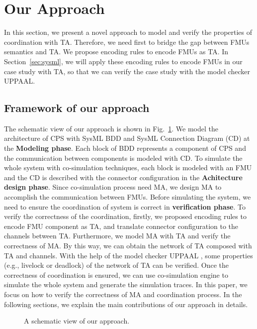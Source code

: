 \section{Our Approach}
In this section, we present a novel approach to model and verify the properties of coordination with TA. Therefore, we need first to bridge the gap between FMUs semantics and TA. We propose encoding rules to encode FMUs as TA. In Section~\ref{sec:sysml}, we will apply these encoding rules to encode FMUs in our case study with TA, so that we can verify the case study with the model checker UPPAAL.
\label{sec:encoding}
\subsection{Framework of our approach}
The schematic view of our approach is shown in Fig.~\ref{paper-arc}. We model the architecture of CPS with SysML BDD and SysML Connection Diagram (CD) at the \textbf{Modeling phase}. Each block of BDD represents a component of CPS and the communication between components is modeled with CD. To simulate the whole system with co-simulation techniques, each block is modeled with an FMU and the CD is described with the connector configuration in the \textbf{Achitecture design phase}. Since co-simulation process need MA, we design MA to accomplish the communication between FMUs. Before simulating the system, we need to ensure the coordination of system is correct in \textbf{verification phase}. To verify the correctness of the coordination, firstly, we proposed encoding rules to encode FMU component as TA, and translate connector configuration to the channels between TA. Furthermore, we model MA with TA and verify the correctness of MA. By this way, we can obtain the network of TA composed with TA and channels. With the help of the model checker UPPAAL \cite{BehrmannDLHPYH06}, some properties (e.g., livelock or deadlock) of the network of TA can be verified. Once the correctness of coordination is ensured, we can use co-simulation engine to simulate the whole system and generate the simulation traces. In this paper, we focus on how to verify the correctness of MA and coordination process. In the following sections, we explain the main contributions of our approach in details.
\begin{figure}[htbp]
	\caption{A schematic view of our approach.}
	\label{paper-arc}
\end{figure}

